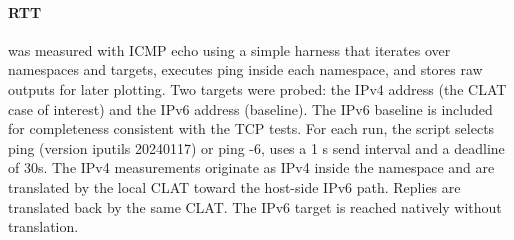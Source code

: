 \paragraph{RTT} was measured with ICMP echo using a simple harness that iterates over namespaces and targets, executes ping inside each namespace, and stores raw outputs for later plotting. Two targets were probed: the IPv4 address (the CLAT case of interest) and the IPv6 address (baseline). The IPv6 baseline is included for completeness consistent with the TCP tests.
For each run, the script selects ping (version iputils 20240117) or ping -6, uses a 1 s send interval and a deadline of 30s. The IPv4 measurements originate as IPv4 inside the namespace and are translated by the local CLAT toward the host-side IPv6 path. Replies are translated back by the same CLAT. The IPv6 target is reached natively without translation. 
